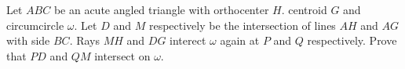 Let $ABC$ be an acute angled triangle with orthocenter $H$. centroid $G$ and circumcircle $\omega$. Let $D$ and  $M$ respectively be the intersection of lines $AH$ and $AG$ with side $BC$. Rays $MH$ and $DG$ interect $ \omega$ again at $P$ and $Q$ respectively. Prove that $PD$ and $QM$ intersect on  $\omega$.